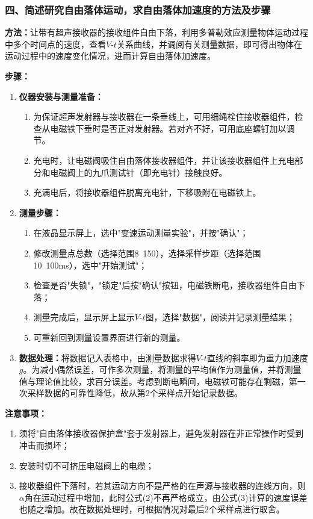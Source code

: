 \documentclass[dvipsnames, svgnames,a4paper,11pt]{article}
\begin{document}
\subsubsection{四、简述研究自由落体运动，求自由落体加速度的方法及步骤}

\textbf{方法：}让带有超声接收器的接收组件自由下落，利用多普勒效应测量物体运动过程中多个时间点的速度，查看$V$-$t$关系曲线，并调阅有关测量数据，即可得出物体在运动过程中的速度变化情况，进而计算自由落体加速度。

\textbf{步骤：}
\begin{enumerate}
	\item \textbf{仪器安装与测量准备：}
	\begin{enumerate}
		\item 为保证超声发射器与接收器在一条垂线上，可用细绳栓住接收器组件，检查从电磁铁下垂时是否正对发射器。若对齐不好，可用底座螺钉加以调节。
		\item 充电时，让电磁阀吸住自由落体接收器组件，并让该接收器组件上充电部分和电磁阀上的九爪测试针（即充电针）接触良好。
		\item 充满电后，将接收器组件脱离充电针，下移吸附在电磁铁上。
	\end{enumerate}
	
	\item \textbf{测量步骤：}
	\begin{enumerate}
		\item 在液晶显示屏上，选中"变速运动测量实验"，并按"确认"；
		\item 修改测量点总数（选择范围8~150），选择采样步距（选择范围10~100ms），选中"开始测试"；
		\item 检查是否"失锁"，"锁定"后按"确认"按钮，电磁铁断电，接收器组件自由下落；
		\item 测量完成后，显示屏上显示$V$-$t$图，选择"数据"，阅读并记录测量结果；
		\item 可重新回到测量设置界面进行新的测量。
	\end{enumerate}
	
	\item \textbf{数据处理：}将数据记入表格中，由测量数据求得$V$-$t$直线的斜率即为重力加速度$g$。为减小偶然误差，可作多次测量，将测量的平均值作为测量值，并将测量值与理论值比较，求百分误差。考虑到断电瞬间，电磁铁可能存在剩磁，第一次采样数据的可靠性降低，故从第2个采样点开始记录数据。
\end{enumerate}

\textbf{注意事项：}
\begin{enumerate}
	\item 须将"自由落体接收器保护盒"套于发射器上，避免发射器在非正常操作时受到冲击而损坏；
	\item 安装时切不可挤压电磁阀上的电缆；
	\item 接收器组件下落时，若其运动方向不是严格的在声源与接收器的连线方向，则$\alpha$角在运动过程中增加，此时公式(2)不再严格成立，由公式(3)计算的速度误差也随之增加。故在数据处理时，可根据情况对最后2个采样点进行取舍。
\end{enumerate}
\end{document}
